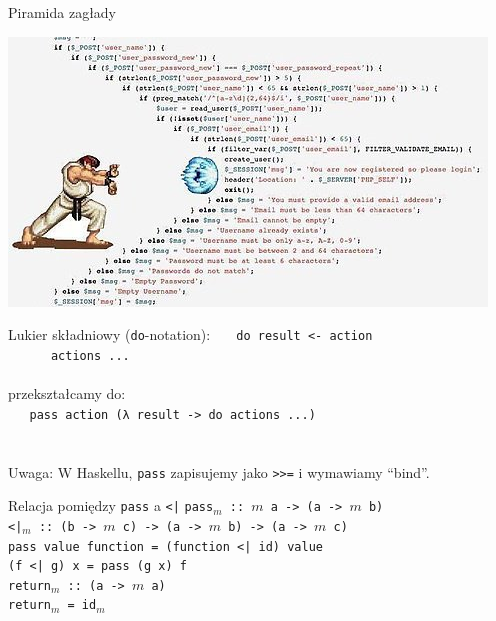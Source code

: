 \documentclass{beamer}
\begin{document}
\begin{frame}{Piramida zagłady}
  \begin{center}
    \includegraphics[height=0.7\paperheight]{ryu.jpg}
  \end{center}
\end{frame}


\begin{frame}{Lukier składniowy (\texttt{do}-notation):}
  \texttt{
    \ \ do result <- action \\
    \ \ \ \ \ \ actions  ... \\
  } \ \\ \pause
  przekształcamy do: \\ \pause
  \texttt{
    \ \ pass action (λ result -> do actions ...) \\
  } \ \\  \pause
  \ \\
  Uwaga: W Haskellu, \texttt{pass} zapisujemy jako
  \texttt{>>=} i wymawiamy ``bind''.
\end{frame}

\begin{frame}{Relacja pomiędzy \texttt{pass} a \texttt{<|}}
  \pause
  \texttt{pass$_m$ :: $m$ a -> (a -> $m$ b)} \\ \pause
  \texttt{<|$_m$ ::\ (b -> $m$ c) -> (a -> $m$ b) -> (a -> $m$ c)} \\ \pause
  \texttt{pass value function = (function <| id) value} \\ \pause
  \texttt{(f <| g) x = pass (g x) f} \\ \pause
  \texttt{return$_m$ :: (a -> $m$ a)} \\ \pause
  \texttt{return$_m$ = id$_m$}
\end{frame}
\end{document}
